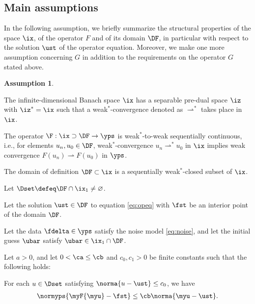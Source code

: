 \documentclass[10pt]{article}
\theoremstyle{definition}
\newtheorem{assumption}[theorem]{Assumption}
\begin{document}
\subsection{Main assumptions}
In the following assumption, we briefly summarize the structural properties of the space $\ix$, of the operator $F$ and of its domain $\DF$, in particular with respect to the solution $\ust$ of the operator equation. Moreover, we make one more assumption concerning $G$ in addition to
the requirements on the operator $G$ stated above.
%
\begin{assumption}
\label{th:main_assump}
\begin{myenumerate_indent}


\item
\label{it:spaces}
The infinite-dimensional Banach space $\ix$ has a separable pre-dual space $\iz$ with $\iz^*=\ix$ such that a weak$^*$-convergence denoted as $\rightharpoonup^*$ takes place in $\ix$.

\item The operator $ \F: \ix \supset \DF \to \yps $ is weak$^*$-to-weak sequentially continuous, i.e., for elements $u_n,u_0 \in \DF$, weak$^*$-convergence $u_n \rightharpoonup^*u_0$ in $\ix$ implies weak convergence $F(u_n) \rightharpoonup F(u_0)$ in $\yps$.

\item
The domain of definition $ \DF \subset \ix $ is a sequentially weak$^*$-closed subset of $\ix$.
%
\item
Let $\Dset \defeq \DF \cap \ix_1 \neq \varnothing $.

\item
Let the solution $ \ust \in \DF $ to equation \eqref{eq:opeq} with \rhs $\fst$ be
an interior point of the domain $ \DF $.

\item
Let the data $ \fdelta \in \yps$ satisfy the noise model \eqref{eq:noise}, and let the
initial guess $\ubar$ satisfy $ \ubar \in \ix_1 \cap \DF$.

\item
\label{it:normequiv_b}
Let $ a > 0 $, and let $ 0 < \ca \le \cb $ and $ c_0, c_1 > 0 $
be finite constants such that the following holds:
%
\begin{mylist}
\item For each $ u \in \Dset $ satisfying $ \norma{u-\ust} \le c_0 $, we have
\begin{align}
\label{eq:normequiv_a}
\normyps{\myF{\myu} - \fst} \le \cb\norma{\myu - \ust}.
\end{align}
%


\end{mylist}
\end{myenumerate_indent}
\end{assumption}
\end{document}
